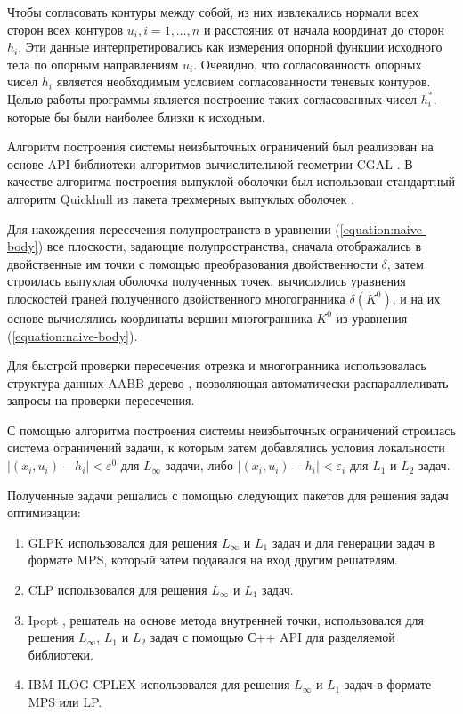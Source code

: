 \documentclass[a4paper, 10pt]{article}
\theoremstyle{definition}
\theoremstyle{plain}
\theoremstyle{plain}
\begin{document}
Чтобы согласовать контуры между собой, из них извлекались нормали всех сторон
всех контуров $u_{i}, i = 1, \ldots, n$ и расстояния от начала координат до
сторон $h_{i}$. Эти данные интерпретировались как измерения опорной функции
исходного тела по опорным направлениям $u_{i}$. Очевидно, что согласованность
опорных чисел $h_{i}$ является необходимым условием согласованности теневых
контуров. Целью работы программы является построение таких согласованных чисел
$h^{*}_{i}$, которые бы были наиболее близки к исходным.

Алгоритм построения системы неизбыточных ограничений был реализован на
основе API библиотеки алгоритмов вычислительной геометрии CGAL \cite{cgal}. В 
качестве алгоритма построения выпуклой оболочки был использован стандартный
алгоритм Quickhull \cite{BarberDobkinHuhdanpaa} из пакета трехмерных
выпуклых оболочек \cite{cgal:3DConvexHulls}.

Для нахождения пересечения
полупространств в уравнении (\ref{equation:naive-body}) все плоскости, задающие
полупространства, сначала отображались в двойственные им точки с помощью 
преобразования двойственности $\delta$, затем строилась выпуклая оболочка
полученных точек, вычислялись уравнения плоскостей граней полученного
двойственного многогранника $\delta(K^{0})$, и на их основе
вычислялись координаты вершин многогранника $K^{0}$ из уравнения
(\ref{equation:naive-body}).

Для быстрой проверки пересечения
отрезка и многогранника использовалась структура данных AABB-дерево
\cite{cgal:AABBTree}, позволяющая автоматически распараллеливать запросы
на проверки пересечения.

С помощью алгоритма построения системы неизбыточных ограничений строилась
система ограничений задачи, к которым затем добавлялись условия локальности
$|(x_{i}, u_{i}) - h_{i}| < \varepsilon^{0}$ для $L_{\infty}$ задачи, либо
$|(x_{i}, u_{i}) - h_{i}| < \varepsilon_{i}$ для $L_{1}$ и $L_{2}$ задач.

Полученные задачи решались с помощью следующих пакетов для решения задач
оптимизации:

\begin{enumerate}
 \item GLPK \cite{glpk} использовался для решения $L_{\infty}$ и $L_{1}$ задач
 и для генерации задач в формате MPS, который затем подавался на вход другим
 решателям.
 \item CLP \cite{clp} использовался для решения $L_{\infty}$ и $L_{1}$ задач.
 \item Ipopt \cite{ipopt, WachterBiegler}, решатель на основе
 метода внутренней точки, использовался для решения $L_{\infty}$, $L_{1}$ и
 $L_{2}$ задач с помощью С++ API для разделяемой библиотеки.
 \item IBM ILOG CPLEX \cite{cplex} использовался для решения
 $L_{\infty}$ и $L_{1}$ задач в формате MPS или LP.
\end{enumerate}
\end{document}
